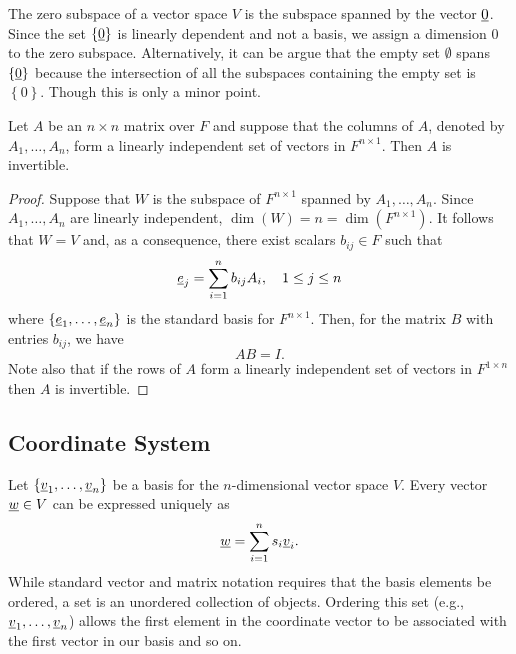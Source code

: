 The zero subspace of a vector space $V$ is the subspace spanned by the vector $\underline{0}$.
Since the set $\left\{ \underline{0} \right\}$ is linearly dependent and not a basis, we assign a dimension $0$ to the zero subspace.
Alternatively, it can be argue that the empty set $\emptyset$ spans $\left\{ \underline{0} \right\}$ because the intersection of all the subspaces containing the empty set is $\left\{ 0 \right\}$.
Though this is only a minor point.

\begin{theorem}
Let $A$ be an $n \times n$ matrix over $F$ and suppose that the columns of $A$, denoted by $A_1, \ldots, A_n$, form a linearly independent set of vectors in $F^{n \times 1}$.
Then $A$ is invertible.
\end{theorem}
\begin{proof}
Suppose that $W$ is the subspace of $F^{n \times 1}$ spanned by $A_1, \ldots, A_n$.
Since $A_1, \ldots, A_n$ are linearly independent, $\dim(W) = n = \dim(F^{n \times 1})$.
It follows that $W = V$ and, as a consequence, there exist scalars $b_{ij} \in F$ such that
\begin{equation*}
\underline{e}_j = \sum_{i=1}^n b_{ij} A_i, \quad 1 \leq j \leq n
\end{equation*}
where $\left\{ \underline{e}_1, \ldots, \underline{e}_n \right\}$ is the standard basis for $F^{n \times 1}$.
Then, for the matrix $B$ with entries $b_{ij}$, we have
\begin{equation*}
AB = I.
\end{equation*}
Note also that if the rows of $A$ form a linearly independent set of vectors in $F^{1 \times n}$ then $A$ is invertible.
\end{proof}


\subsection{Coordinate System}

Let $\left\{ \underline{v}_1, \ldots, \underline{v}_n \right\}$ be a basis for the $n$-dimensional vector space $V$.
Every vector $\underline{w} \in V$ can be expressed uniquely as
\begin{equation*}
\underline{w} = \sum_{i=1}^n s_i \underline{v}_i.
\end{equation*}
While standard vector and matrix notation requires that the basis elements be ordered, a set is an unordered collection of objects.
Ordering this set (e.g., $\underline{v}_1, \ldots, \underline{v}_n$) allows the first element in the coordinate vector to be associated with the first vector in our basis and so on.


